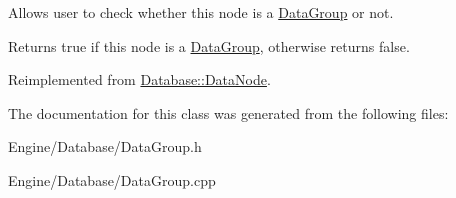 Allows user to check whether this node is a \hyperlink{classDatabase_1_1DataGroup}{Data\+Group} or not. 

\begin{DoxyReturn}{Returns}
true if this node is a \hyperlink{classDatabase_1_1DataGroup}{Data\+Group}, otherwise returns false. 
\end{DoxyReturn}


Reimplemented from \hyperlink{classDatabase_1_1DataNode_a996e222a24c6f3e1bc646fe31e26af1b}{Database\+::\+Data\+Node}.



The documentation for this class was generated from the following files\+:\begin{DoxyCompactItemize}
\item 
Engine/\+Database/Data\+Group.\+h\item 
Engine/\+Database/Data\+Group.\+cpp\end{DoxyCompactItemize}
